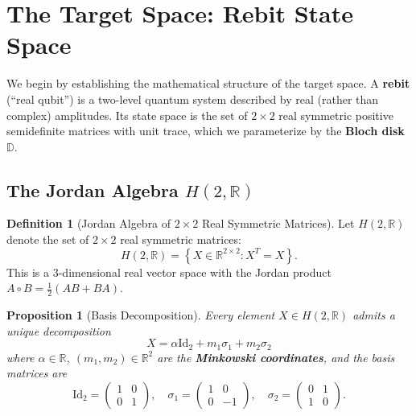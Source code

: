 \documentclass[11pt]{article}
\theoremstyle{plain}
\newtheorem{proposition}[theorem]{Proposition}
\theoremstyle{definition}
\newtheorem{definition}[theorem]{Definition}
\theoremstyle{remark}
\newcommand{\R}{\mathbb{R}}
\newcommand{\D}{\mathbb{D}}
\newcommand{\Id}{\mathrm{Id}}
\begin{document}
\section{The Target Space: Rebit State Space}
\label{sec:target}

We begin by establishing the mathematical structure of the target space. A \textbf{rebit} (``real qubit'') is a two-level quantum system described by real (rather than complex) amplitudes. Its state space is the set of $2 \times 2$ real symmetric positive semidefinite matrices with unit trace, which we parameterize by the \textbf{Bloch disk} $\D$.

\subsection{The Jordan Algebra $H(2,\R)$}

\begin{definition}[Jordan Algebra of $2\times 2$ Real Symmetric Matrices]
Let $H(2,\R)$ denote the set of $2 \times 2$ real symmetric matrices:
\begin{equation}
H(2,\R) = \left\{ X \in \R^{2\times 2} : X^T = X \right\}.
\end{equation}
This is a 3-dimensional real vector space with the Jordan product $A \circ B = \frac{1}{2}(AB + BA)$.
\end{definition}

\begin{proposition}[Basis Decomposition]
Every element $X \in H(2,\R)$ admits a unique decomposition
\begin{equation}
X = \alpha \Id_2 + m_1 \sigma_1 + m_2 \sigma_2
\end{equation}
where $\alpha \in \R$, $(m_1, m_2) \in \R^2$ are the \textbf{Minkowski coordinates}, and the basis matrices are
\begin{equation}
\Id_2 = \begin{pmatrix} 1 & 0 \\ 0 & 1 \end{pmatrix}, \quad
\sigma_1 = \begin{pmatrix} 1 & 0 \\ 0 & -1 \end{pmatrix}, \quad
\sigma_2 = \begin{pmatrix} 0 & 1 \\ 1 & 0 \end{pmatrix}.
\end{equation}
\end{proposition}
\end{document}
